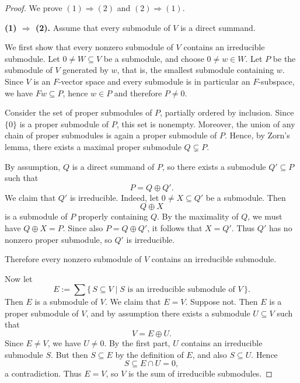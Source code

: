 \begin{proof}
    We prove $(1)\Rightarrow(2)$ and $(2)\Rightarrow(1)$.

    \medskip
    \noindent\textbf{(1) $\Rightarrow$ (2).}
    Assume that every submodule of $V$ is a direct summand.

    We first show that every nonzero submodule of $V$ contains an irreducible submodule.
    Let $0\neq W\subseteq V$ be a submodule, and choose $0\neq w\in W$.
    Let $P$ be the submodule of $V$ generated by $w$, that is, the smallest submodule containing $w$.
    Since $V$ is an $F$-vector space and every submodule is in particular an $F$-subspace, we have $Fw\subseteq P$, hence $w\in P$ and therefore $P\neq 0$.

    Consider the set of proper submodules of $P$, partially ordered by inclusion.
    Since $\{0\}$ is a proper submodule of $P$, this set is nonempty.
    Moreover, the union of any chain of proper submodules is again a proper submodule of $P$.
    Hence, by Zorn's lemma, there exists a maximal proper submodule $Q\subsetneq P$.

    By assumption, $Q$ is a direct summand of $P$, so there exists a submodule $Q'\subseteq P$ such that
    \[
        P=Q\oplus Q'.
    \]
    We claim that $Q'$ is irreducible.
    Indeed, let $0\neq X\subseteq Q'$ be a submodule.
    Then
    \[
        Q\oplus X
    \]
    is a submodule of $P$ properly containing $Q$.
    By the maximality of $Q$, we must have $Q\oplus X=P$.
    Since also $P=Q\oplus Q'$, it follows that $X=Q'$.
    Thus $Q'$ has no nonzero proper submodule, so $Q'$ is irreducible.

    Therefore every nonzero submodule of $V$ contains an irreducible submodule.

    Now let
    \[
        E:=\sum \{\, S\subseteq V \mid S \text{ is an irreducible submodule of }V \,\}.
    \]
    Then $E$ is a submodule of $V$.
    We claim that $E=V$.
    Suppose not. Then $E$ is a proper submodule of $V$, and by assumption there exists a submodule $U\subseteq V$ such that
    \[
        V=E\oplus U.
    \]
    Since $E\neq V$, we have $U\neq 0$.
    By the first part, $U$ contains an irreducible submodule $S$.
    But then $S\subseteq E$ by the definition of $E$, and also $S\subseteq U$.
    Hence
    \[
        S\subseteq E\cap U=0,
    \]
    a contradiction.
    Thus $E=V$, so $V$ is the sum of irreducible submodules.


\end{proof}
